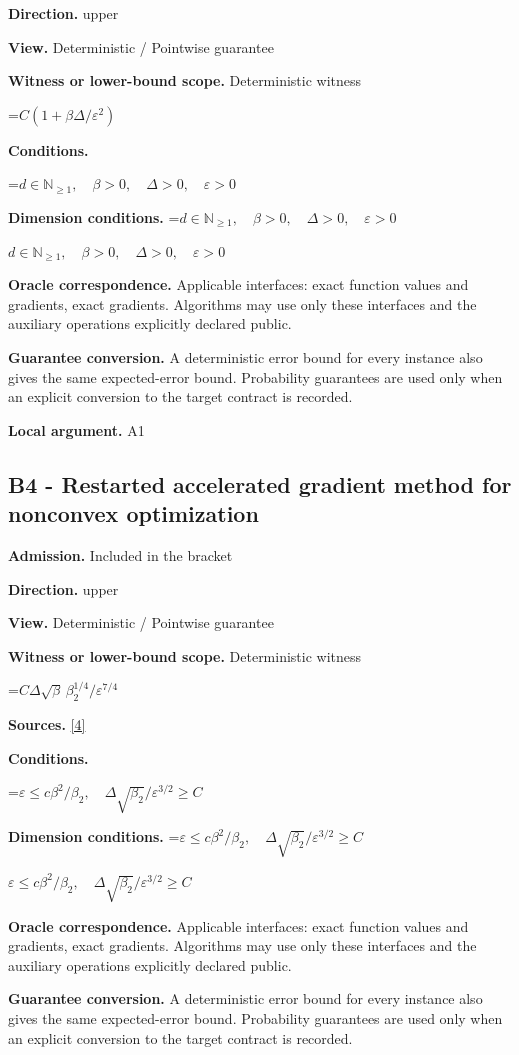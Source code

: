 \documentclass[10pt,a4paper]{article}
\newcommand{\AtlasMath}[1]{\par\begingroup\centering\setbox0=\hbox{$\displaystyle #1$}\ifdim\wd0>1.4\linewidth\typeout{ATLAS WIDE FORMULA: \the\wd0}\fi\ifdim\wd0>\linewidth\resizebox{\linewidth}{!}{\box0}\else\box0\fi\par\endgroup}
\newcommand{\AtlasInlineMath}[1]{\begingroup\setbox0=\hbox{$#1$}\ifdim\wd0>.4\linewidth\endgroup\AtlasMath{#1}\else\endgroup$#1$\fi}
\begin{document}
\textbf{Direction.} upper

\textbf{View.} Deterministic / Pointwise guarantee

\textbf{Witness or lower-bound scope.} Deterministic witness

\AtlasMath{C(1+\beta\Delta/\varepsilon^2)}
\textbf{Conditions.} 
\AtlasMath{d\in\mathbb{N}_{\ge1},\quad \beta>0,\quad \Delta>0,\quad \varepsilon>0}


\textbf{Dimension conditions.} \AtlasInlineMath{d\in\mathbb{N}_{\ge1},\quad \beta>0,\quad \Delta>0,\quad \varepsilon>0}

\textbf{Oracle correspondence.} Applicable interfaces: exact function values and gradients, exact gradients. Algorithms may use only these interfaces and the auxiliary operations explicitly declared public.

\textbf{Guarantee conversion.} A deterministic error bound for every instance also gives the same expected-error bound. Probability guarantees are used only when an explicit conversion to the target contract is recorded.

\textbf{Local argument.} A1

\subsection{B4 - Restarted accelerated gradient method for nonconvex optimization}
\textbf{Admission.} Included in the bracket

\textbf{Direction.} upper

\textbf{View.} Deterministic / Pointwise guarantee

\textbf{Witness or lower-bound scope.} Deterministic witness

\AtlasMath{C\Delta\sqrt\beta\,\beta_2^{1/4}/\varepsilon^{7/4}}
\textbf{Sources.} \href{https://jmlr.org/papers/volume24/22-0522/22-0522.pdf}{[4]}

\textbf{Conditions.} 
\AtlasMath{\varepsilon\le c\beta^2/\beta_2,\quad\Delta\sqrt{\beta_2}/\varepsilon^{3/2}\ge C}


\textbf{Dimension conditions.} \AtlasInlineMath{\varepsilon\le c\beta^2/\beta_2,\quad\Delta\sqrt{\beta_2}/\varepsilon^{3/2}\ge C}

\textbf{Oracle correspondence.} Applicable interfaces: exact function values and gradients, exact gradients. Algorithms may use only these interfaces and the auxiliary operations explicitly declared public.

\textbf{Guarantee conversion.} A deterministic error bound for every instance also gives the same expected-error bound. Probability guarantees are used only when an explicit conversion to the target contract is recorded.
\end{document}
